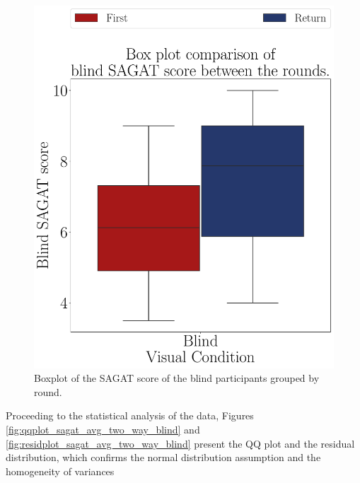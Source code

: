 \begin{figure}[!htb]
\begin{minipage}{0.45\textwidth}
        \includegraphics[width = \textwidth]{Resultados/Sagat/Figuras/pdf/boxplot_sagat_blind_rounds.pdf}
        \caption{Boxplot of the SAGAT score of the blind participants grouped by round.}
        \label{fig:boxplot_sagat_blind_rounds}
    \end{minipage}
\end{figure}


Proceeding to the statistical analysis of the data, Figures \ref{fig:qqplot_sagat_avg_two_way_blind} and \ref{fig:residplot_sagat_avg_two_way_blind} present the QQ plot and the residual distribution, which confirms the normal distribution assumption and the homogeneity of variances

